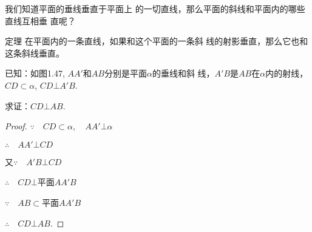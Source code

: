 我们知道平面的垂线垂直于平面上
  的一切直线，那么平面的斜线和平面内的哪些直线互相垂
  直呢？
  
\begin{blk}
{定理} 在平面内的一条直线，如果和这个平面的一条斜
  线的射影垂直，那么它也和这条斜线垂直。
  \end{blk}

已知：如图1.47, $AA'$和$AB$分别是平面$\alpha$的垂线和斜
线，$A'B$是$AB$在$\alpha$内的射线，$CD\subset \alpha$, $CD\bot A'B$.

求证：$CD\bot AB$.

\begin{proof}
 $\because\quad  CD\subset \alpha,\quad AA'\bot \alpha$

$\therefore\quad  AA'\bot CD$

又$\because\quad A'B\bot CD$

$\therefore\quad CD\bot $平面$AA'B$

$\because\quad AB\subset $平面$AA'B$

$\therefore\quad CD\bot AB$.
\end{proof}

